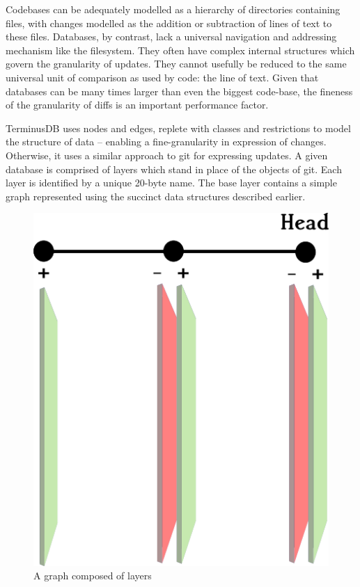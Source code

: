 \documentclass[10pt, a4paper, twocolumn]{article} %
\begin{document}
Codebases can be adequately modelled as a hierarchy of directories
containing files, with changes modelled as the addition or subtraction
of lines of text to these files. Databases, by contrast, lack a
universal navigation and addressing mechanism like the filesystem.
They often have complex internal structures which govern the
granularity of updates. They cannot usefully be reduced to the same
universal unit of comparison as used by code: the line of text. Given
that databases can be many times larger than even the biggest
code-base, the fineness of the granularity of diffs is an important
performance factor.

TerminusDB uses nodes and edges, replete with classes and restrictions
to model the structure of data – enabling a fine-granularity in
expression of changes. Otherwise, it uses a similar approach to git for
expressing updates. A given database is comprised of layers which
stand in place of the objects of git. Each layer is identified by a
unique 20-byte name. The base layer contains a simple graph
represented using the succinct data structures described earlier.

\begin{figure}
	\includegraphics[width=\linewidth]{layers-diagram.png} %
	\caption{A graph composed of layers} %
	\label{fig:layers} %
\end{figure}
\end{document}
